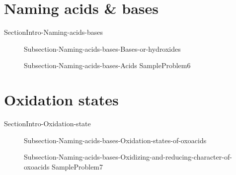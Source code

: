 \documentclass[main.tex]{subfiles}
\begin{document}
\section{Naming acids \& bases}
{SectionIntro-Naming-acids-bases}
\sloppy \begin{description}
\item[]{Subsection-Naming-acids-bases-Bases-or-hydroxides}
\item[]{Subsection-Naming-acids-bases-Acids}
{SampleProblem6}
\end{description}

\section{Oxidation states}
{SectionIntro-Oxidation-state}

\sloppy \begin{description}
\item[] {Subsection-Naming-acids-bases-Oxidation-states-of-oxoacids}
\item[] {Subsection-Naming-acids-bases-Oxidizing-and-reducing-character-of-oxoacids}
{SampleProblem7}
\end{description}
\end{document}
